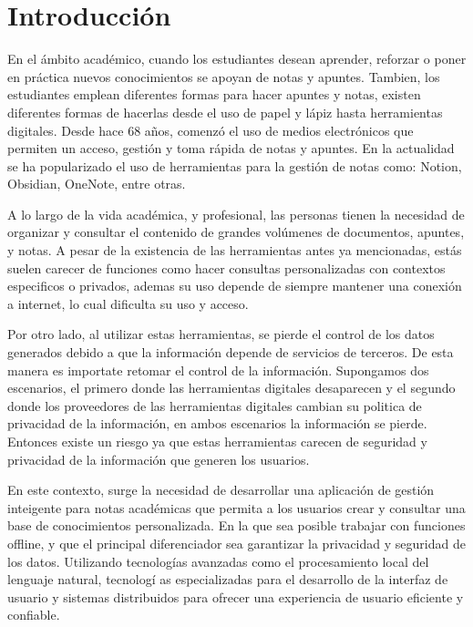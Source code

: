 \chapter{Introducción}
\thispagestyle{fancy}

\justifying

En el ámbito académico, cuando los estudiantes desean aprender, reforzar o poner en práctica nuevos conocimientos se apoyan de notas y apuntes. Tambien, los estudiantes emplean diferentes formas para hacer apuntes y notas, existen diferentes formas de hacerlas desde el uso de papel y lápiz hasta herramientas digitales. Desde hace 68 años, comenzó el uso de medios electrónicos que permiten un acceso, gestión y toma rápida de notas y apuntes. En la actualidad se ha popularizado el uso de herramientas para la gestión de notas como: Notion, Obsidian, OneNote, entre otras.

\vspace{.5cm}

A lo largo de la vida académica, y profesional, las personas tienen la necesidad de organizar y consultar el contenido de grandes volúmenes de documentos, apuntes, y notas. A pesar de la existencia de las herramientas antes ya mencionadas, estás suelen carecer de funciones como hacer consultas personalizadas con contextos especificos o privados, ademas su uso depende de siempre mantener una conexión a internet, lo cual dificulta su uso y acceso.

\vspace{.5cm}

Por otro lado, al utilizar estas herramientas, se pierde el control de los datos generados debido a que la información depende de servicios de terceros. De esta manera es importate retomar el control de la información. Supongamos dos escenarios, el primero donde las herramientas digitales desaparecen y el segundo donde los proveedores de las herramientas digitales cambian su politica de privacidad de la información, en ambos escenarios la información se pierde. Entonces existe un riesgo ya que estas herramientas carecen de seguridad y privacidad de la información que generen los usuarios.

\vspace{.5cm}

En este contexto, surge la necesidad de desarrollar una aplicación de gestión inteigente para notas académicas que permita a los usuarios crear y consultar una base de conocimientos personalizada. En la que sea posible trabajar con funciones offline, y que el principal diferenciador sea garantizar la privacidad y seguridad de los datos. Utilizando tecnologías avanzadas como el procesamiento local del lenguaje natural, tecnologí
as especializadas para el desarrollo de la interfaz de usuario y sistemas distribuidos para ofrecer una experiencia de usuario eficiente y confiable.

